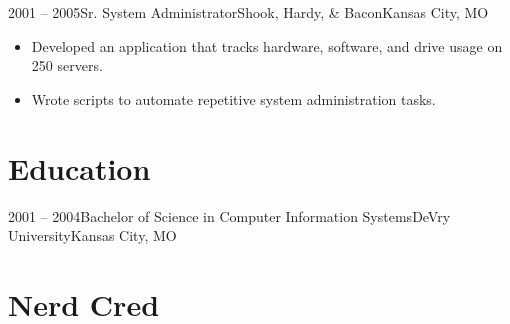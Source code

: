 \documentclass[11pt,letterpaper,final]{moderncv}
\begin{document}
	\cventry
{2001 -- 2005}{Sr. System Administrator}{Shook, Hardy, \& Bacon}{Kansas City, MO}{}{
	\begin{itemize}
		\item Developed an application that tracks hardware, software, and drive usage on 250 servers.
		\item Wrote scripts to automate repetitive system administration tasks.
	\end{itemize}
	}

\section{Education} 
	\cventry
{2001 -- 2004}{Bachelor of Science in Computer Information Systems}{DeVry University}{Kansas City, MO}{}{}

\section{Nerd Cred}
	\cvlistitem{My first computer was an Apple {][}.}
\end{document}
